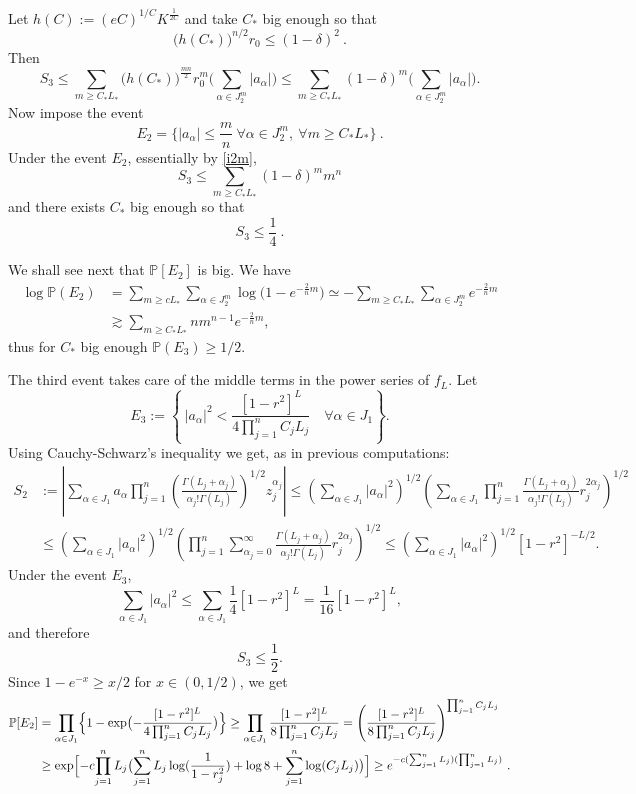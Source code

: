 \documentclass[12pt,twoside,final,amsfonts]{amsart}
\theoremstyle{plain}
\theoremstyle{definition}
\theoremstyle{definition}
\begin{document}
Let $h(C):= (eC)^{1/C} K^{\frac 1{2C}}$ and take $C_*$ big enough so that 
\[
 \bigl( h(C_*)\bigr)^{n/2} r_0\leq (1-\delta)^2\ .
\]
Then
\[
 S_3\leq \sum_{m\geq C_*L_*} \bigl(h(C_*)\bigr)^{\frac{mn}2} r_0^m \bigl(\sum_{\alpha\in J_2^m} |a_\alpha|\bigr) \leq \sum_{m\geq C_*L_*} (1-\delta)^m\bigl(\sum_{\alpha\in J_2^m} |a_\alpha|\bigr).
\]
Now impose the event
\[
 E_2=\bigl\{|a_\alpha|\leq\frac mn\ \forall \alpha\in J_2^m,\ \forall m\geq C_* L_*\bigr\}\ .
\]
Under the event $E_2$, essentially by \eqref{i2m},
\[
 S_3\leq \sum_{m\geq C_* L_*}  (1-\delta)^m m^n
\]
and there exists $C_*$ big enough so that 
\[
 S_3\leq \frac 14\ .
\]

We shall see next that $\mathbb P[E_2]$ is big. We have
\begin{align*}
 \log\mathbb P(E_2)&= \sum_{m\geq cL_*} \sum_{\alpha\in J_2^m} \log\bigl(1-e^{-\frac 2n m}\bigr)\simeq 
 - \sum_{m\geq C_*L_*} \sum_{\alpha\in J_2^m} e^{-\frac 2n m}\\
 &\gtrsim \sum_{m\geq C_*L_*}  n m^{n-1} e^{-\frac 2n m} ,
\end{align*}
thus for $C_*$ big enough $\mathbb P(E_3)\geq 1/2$.

The third event takes care of the middle terms in the power series of $f_L$. Let
\[
E_3:=\left\{\ |a_\alpha|^2<\frac{[1-r^2]^{L}}{4\prod_{j=1}^n C_j L_j}\quad \forall \alpha\in J_1\right\}.
\]
Using Cauchy-Schwarz's inequality we get, as in previous computations:
\begin{align*}
S_2&:= \left|\sum_{\alpha\in J_1} a_{\alpha} \prod_{j=1}^n \left(\frac{\Gamma(L_j+\alpha_j)}{\alpha_j! \Gamma(L_j)}\right)^{1/2} z_j^{\alpha_j}\right|\leq
\left(\sum_{\alpha\in J_1}|a_{\alpha}|^2\right)^{1/2}
\left(\sum_{\alpha\in J_1} \prod_{j=1}^n  \frac{\Gamma(L_j+\alpha_j)}{\alpha_j! \Gamma(L_j)}  r_j^{2\alpha_j} \right)^{1/2}\\
& \leq \left(\sum_{\alpha\in J_1} |a_{\alpha}|^2\right)^{1/2} \left(\prod_{j=1}^n\sum_{\alpha_j=0}^\infty \frac{\Gamma(L_j+\alpha_j)}{\alpha_j! \Gamma(L_j)}  r_j^{2\alpha_j}  \right)^{1/2}
\leq \left(\sum_{\alpha\in J_1}|a_{\alpha}|^2\right)^{1/2}[1-r^2]^{-L/2}.
\end{align*}
Under the event $E_3$,
\[
\sum_{\alpha\in J_1}|a_{\alpha}|^2\leq \sum_{\alpha\in J_1}\frac{1}{4} [1-r^2]^{L}
=\frac{1}{16}[1-r^2]^{L},
\]
and therefore
\[
S_3\leq \frac{1}{2}.
\]
Since $1-e^{-x}\geq x/2$ for $x\in(0,1/2)$, we get
\begin{align*}
\mathbb P[E_2]&=\prod_{\alpha\in J_1}\Bigl\{1-\exp\bigl(-\frac{[1-r^2]^{L}}{4\prod_{j=1}^n C_j L_j}\bigr)\Bigr\}\geq \prod_{\alpha\in J_1} \frac{[1-r^2]^{L}}{8\prod_{j=1}^n C_j L_j}=\left(\frac{[1-r^2]^{L}}{8\prod_{j=1}^n C_j L_j}\right)^{\prod_{j=1}^n C_j L_j}\\
&\geq \exp\Bigl[-c{\prod_{j=1}^n L_j}\bigl({\sum_{j=1}^n L_j}\log(\frac 1{1-r_j^2})+\log 8+\sum_{j=1}^n\log (C_j L_j)\bigr)\Bigr]\geq e^{-c{(\sum_{j=1}^n L_j)(\prod_{j=1}^n L_j)}}\ .
\end{align*}
\end{document}
